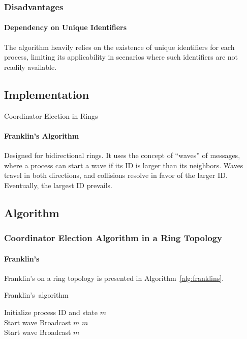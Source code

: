 \documentclass[11pt]{beamer}              %
\begin{document}
\begin{frame}
    \frametitle{Disadvantages}
    \framesubtitle{Dependency on Unique Identifiers}
    The algorithm heavily relies on the existence of unique identifiers for each process, limiting its applicability in scenarios where such identifiers are not readily available.
\end{frame}







\subsection{Implementation}
\begin{frame}{Coordinator Election in Rings}
\framesubtitle{Franklin's Algorithm}
Designed for bidirectional rings. It uses the concept of “waves” of messages, where a process can start a wave if its ID is larger than its neighbors. Waves travel in both directions, and collisions resolve in favor of the larger ID. Eventually, the largest ID prevails.

\note{
}
\end{frame}


\subsection{Algorithm}

\begin{frame}
\frametitle{Coordinator Election Algorithm in a Ring Topology}
\framesubtitle{Franklin's}
Franklin's on a ring topology is presented in Algorithm~\ref{alg:franklins}.
\begin{center}
    \begin{algorithm}[H]
        \scriptsize
        \def\algorithmlabel{Franklin's}
        \caption{\algorithmlabel\ algorithm}
        \label{alg:franklins}
        \begin{algorithmic}[1]
            \State Initialize process ID and state
             { $m$ }
                \\
                 {Start wave}
                \State Broadcast $m$
             { $m$ }  
                \\
                 {Start wave}
                \State Broadcast $m$
        \end{algorithmic}
    \end{algorithm}
    \end{center}
    \end{frame}
\end{document}

